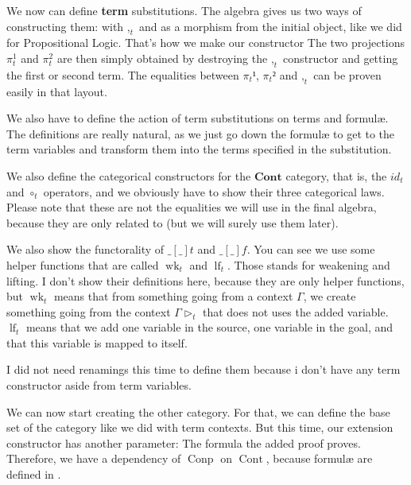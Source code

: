 \documentclass[10pt,a4paper]{article}
\begin{document}
			We now can define \textbf{term} substitutions. The algebra gives us two ways of constructing them: with $,_t$ and as a morphism from the initial object, like we did for Propositional Logic. That's how we make our constructor The two projections $\pi_t^1$ and $\pi_t^2$ are then simply obtained by destroying the $,_t$ constructor and getting the first or second term. The equalities between $\pi_t¹$, $\pi_t²$ and $,_t$ can be proven easily in that layout.
			
			We also have to define the action of term substitutions on terms and formulæ. The definitions are really natural, as we just go down the formulæ to get to the term variables and transform them into the terms specified in the substitution.
			
			We also define the categorical constructors for the $\textbf{Cont}$ category, that is, the $id_t$ and $\circ_t$ operators, and we obviously have to show their three categorical laws. Please note that these are not the equalities we will use in the final algebra, because they are only related to  (but we will surely use them later).
		
			We also show the functorality of $\_\left[\_\right]\!t$ and $\_\left[\_\right]\!f$.	You can see we use some helper functions that are called $\operatorname{wk}_t$ and $\operatorname{lf}_t$. Those stands for weakening and lifting. I don't show their definitions here, because they are only helper functions, but $\operatorname{wk}_t$ means that from something going from a context $\Gamma$, we create something going from the context $\Gamma \triangleright_t$ that does not uses the added variable. $\operatorname{lf}_t$ means that we add one variable in the source, one variable in the goal, and that this variable is mapped to itself.
			
			I did not need renamings this time to define them because i don't have any term constructor aside from term variables.
			
			\begin{tcolorbox}
				\agdasep
				\agdasep
				\agdasep
			\end{tcolorbox}
		
			We can now start creating the other category. For that, we can define the base set of the category like we did with term contexts. But this time, our extension constructor has another parameter: The formula the added proof proves. Therefore, we have a dependency of $\operatorname{Conp}$ on $\operatorname{Cont}$, because formulæ are defined in .
			
\end{document}
